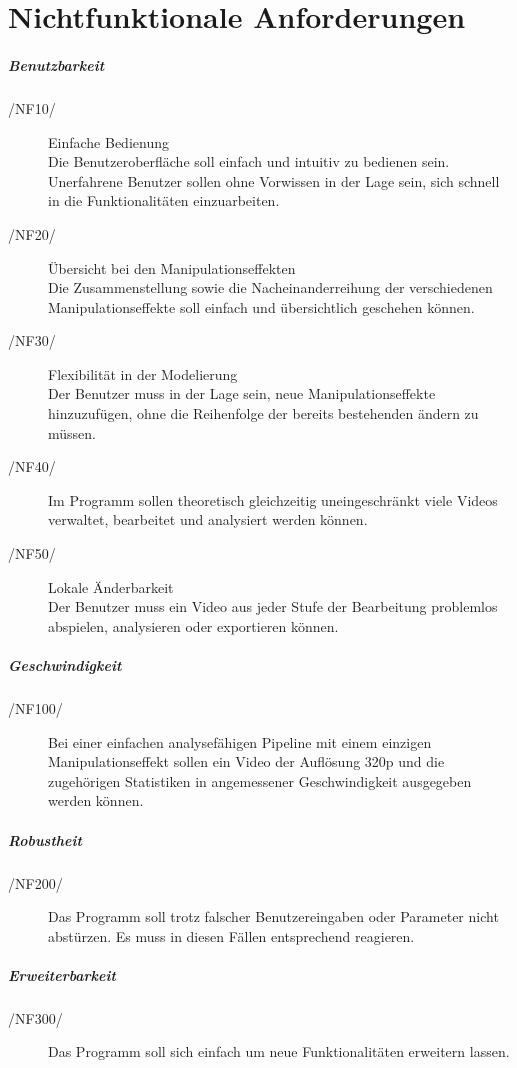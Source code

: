 \section{Nichtfunktionale Anforderungen}

\subparagraph{Benutzbarkeit}
\begin{description}
	\item[/NF10/] Einfache Bedienung \\ Die Benutzeroberfläche soll einfach und intuitiv zu bedienen sein. Unerfahrene Benutzer sollen ohne Vorwissen in der Lage sein, sich schnell in die Funktionalitäten einzuarbeiten.
	\item[/NF20/] Übersicht bei den Manipulationseffekten \\ Die Zusammenstellung sowie die Nacheinanderreihung der verschiedenen Manipulationseffekte soll einfach und übersichtlich geschehen können. 
	\item[/NF30/] Flexibilität in der Modelierung \\ Der Benutzer muss in der Lage sein, neue Manipulationseffekte hinzuzufügen, ohne die Reihenfolge der bereits bestehenden ändern zu müssen.
	\item[/NF40/] Im Programm sollen theoretisch gleichzeitig uneingeschränkt viele Videos verwaltet, bearbeitet und analysiert werden können.
	\item[/NF50/] Lokale Änderbarkeit \\ Der Benutzer muss ein Video aus jeder Stufe der Bearbeitung problemlos abspielen, analysieren oder exportieren können.
\end{description}

\subparagraph{Geschwindigkeit}

\begin{description}
	\item[/NF100/] Bei einer einfachen analysefähigen Pipeline mit einem einzigen Manipulationseffekt sollen ein Video der Auflösung 320p und die zugehörigen Statistiken in angemessener Geschwindigkeit
 ausgegeben werden können.
\end{description}

\subparagraph{Robustheit}

\begin{description}
	\item[/NF200/] Das Programm soll trotz falscher Benutzereingaben oder Parameter nicht abstürzen. Es muss in diesen Fällen entsprechend reagieren.
\end{description}

\subparagraph{Erweiterbarkeit}

\begin{description}
	\item[/NF300/] Das Programm soll sich einfach um neue Funktionalitäten erweitern lassen.
\end{description}
